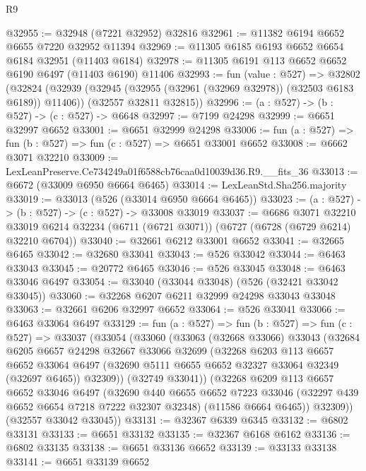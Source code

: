 \begin{lexlean}{R9}
\begin{coremodule}
@32955 := @32948 (@7221 @32952) @32816
@32961 := @11382 @6194 @6652 @6655 @7220 @32952 @11394
@32969 := @11305 @6185 @6193 @6652 @6654 @6184 @32951 (@11403 @6184)
@32978 := @11305 @6191 @113 @6652 @6652 @6190 @6497 (@11403 @6190) @11406
@32993 := fun (value : @527) =>
  @32802
    (@32824
      (@32939 (@32945 (@32955 (@32961 (@32969 @32978)) (@32503 @6183 @6189)) @11406))
      (@32557 @32811 @32815))
@32996 := (a : @527) -> (b : @527) -> (c : @527) -> @6648
@32997 := @7199 @24298
@32999 := @6651 @32997 @6652
@33001 := @6651 @32999 @24298
@33006 := fun (a : @527) => fun (b : @527) => fun (c : @527) => @6651 @33001 @6652
@33008 := @6662 @3071 @32210
@33009 := LexLeanPreserve.Ce734249a01f6588cb76caa0d10039d36.R9.__fits_36
@33013 := @6672 (@33009 @6950 @6664 @6465)
@33014 := LexLeanStd.Sha256.majority
@33019 := @33013 (@526 (@33014 @6950 @6664 @6465))
@33023 := (a : @527) -> (b : @527) -> (c : @527) -> @33008 @33019
@33037 := @6686
    @3071
    @32210
    @33019
    @6214
    @32234
    (@6711 (@6721 @3071))
    (@6727 (@6728 (@6729 @6214) @32210 @6704))
@33040 := @32661 @6212 @33001 @6652
@33041 := @32665 @6465
@33042 := @32680 @33041
@33043 := @526 @33042
@33044 := @6463 @33043
@33045 := @20772 @6465
@33046 := @526 @33045
@33048 := @6463 @33046 @6497
@33054 := @33040 (@33044 @33048) (@526 (@32421 @33042 @33045))
@33060 := @32268 @6207 @6211 @32999 @24298 @33043 @33048
@33063 := @32661 @6206 @32997 @6652
@33064 := @526 @33041
@33066 := @6463 @33064 @6497
@33129 := fun (a : @527) =>
  fun (b : @527) =>
  fun (c : @527) =>
  @33037
    (@33054
      (@33060
        (@33063
          (@32668 @33066)
          @33043
          (@32684
            @6205
            @6657
            @24298
            @32667
            @33066
            @32699
            (@32268
              @6203
              @113
              @6657
              @6652
              @33064
              @6497
              (@32690 @5111 @6655 @6652 @32327 @33064 @32349 (@32697 @6465))
              @32309))
          (@32749 @33041))
        (@32268
          @6209
          @113
          @6657
          @6652
          @33046
          @6497
          (@32690
            @440
            @6655
            @6652
            @7223
            @33046
            (@32297 @439 @6652 @6654 @7218 @7222 @32307 @32348)
            (@11586 @6664 @6465))
          @32309))
      (@32557 @33042 @33045))
@33131 := @32367 @6339 @6345
@33132 := @6802 @33131
@33133 := @6651 @33132
@33135 := @32367 @6168 @6162
@33136 := @6802 @33135
@33138 := @6651 @33136 @6652
@33139 := @33133 @33138
@33141 := @6651 @33139 @6652

\end{coremodule}
\end{lexlean}
